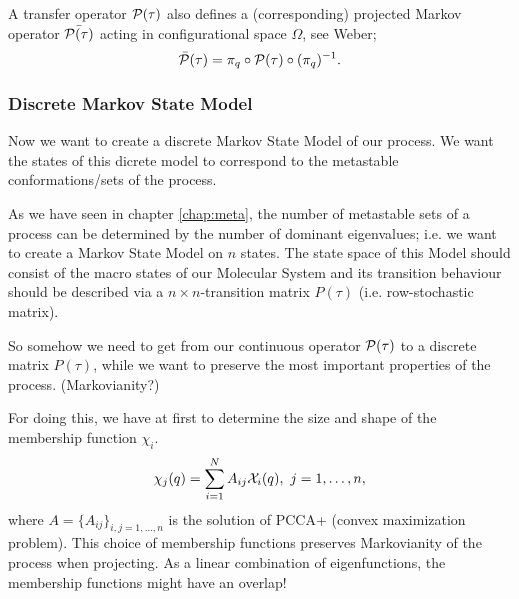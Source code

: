 A transfer operator $\mathcal{P}(\tau)$ also defines a (corresponding) projected Markov operator  $\bar{\mathcal{P}(\tau)}$ acting in configurational space $\Omega$, see Weber\cite{weber2011subspace};
\begin{equation*}
\bar{\mathcal{P}} (\tau) = \pi_q \circ \mathcal{P}(\tau) \circ (\pi_q)^{-1}.
\end{equation*}

\subsubsection*{Discrete Markov State Model}
Now we want to create a discrete Markov State Model of our process. We want the states of this dicrete model to correspond to the metastable conformations/sets of the process.

As we have seen in chapter \ref{chap:meta}, the number of metastable sets of a process can be determined by the number of dominant eigenvalues; i.e. we want to create a Markov State Model on $n$ states.
The state space of this Model should consist of the macro states of our Molecular System and its transition behaviour should be described via a $n\times n$-transition matrix $P(\tau)$ (i.e. row-stochastic matrix).

So somehow we need to get from our continuous operator $\mathcal{P}(\tau)$ to a discrete matrix $P(\tau)$, while we want to preserve the most important properties of the process.
(Markovianity?)

For doing this, we have at first to determine the size and shape of the membership function $\chi_i$.
\begin{equation}
\chi_j(q) = \sum_{i=1}^N A_{ij}\mathcal{X}_i(q), \ j=1,\dots,n,
\end{equation}
where $A= \{A_{ij}\}_{i,j=1,\dots,n}$ is the solution of PCCA+ (convex maximization problem).
This choice of membership functions preserves Markovianity of the process when projecting. 
As a linear combination of eigenfunctions, the membership functions might have an overlap!

